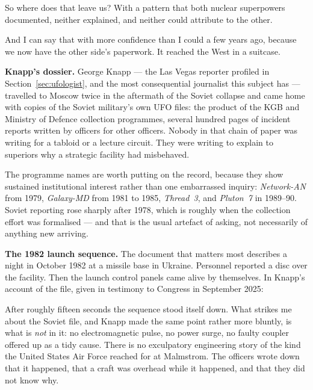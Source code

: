 So where does that leave us? With a pattern that both nuclear superpowers documented, neither
explained, and neither could attribute to the other.

And I can say that with more confidence than I could a few years ago, because we now have the
other side's paperwork. It reached the West in a suitcase.

\textbf{Knapp's dossier.} George Knapp --- the Las Vegas reporter profiled in Section~\ref{sec:ufologist}, and
the most consequential journalist this subject has --- travelled to Moscow twice in the aftermath
of the Soviet collapse and came home with copies of the Soviet military's own UFO files: the
product of the KGB and Ministry of Defence collection programmes, several hundred pages of
incident reports written by officers for other officers. Nobody in that chain of paper was writing
for a tabloid or a lecture circuit. They were writing to explain to superiors why a strategic
facility had misbehaved.

The programme names are worth putting on the record, because they show sustained institutional
interest rather than one embarrassed inquiry: \emph{Network-AN} from 1979, \emph{Galaxy-MD} from
1981 to 1985, \emph{Thread~3}, and \emph{Pluton~7} in 1989--90. Soviet reporting rose sharply
after 1978, which is roughly when the collection effort was formalised --- and that is the usual
artefact of asking, not necessarily of anything new arriving.

\textbf{The 1982 launch sequence.} The document that matters most describes a night in October 1982
at a missile base in Ukraine. Personnel reported a disc over the facility. Then the launch control
panels came alive by themselves. In Knapp's account of the file, given in testimony to Congress in
September 2025:


After roughly fifteen seconds the sequence stood itself down. What strikes me about the Soviet
file, and Knapp made the same point rather more bluntly, is what is \emph{not} in it: no
electromagnetic pulse, no power surge, no faulty coupler offered up as a tidy cause. There is no
exculpatory engineering story of the kind the United States Air Force reached for at Malmstrom. The
officers wrote down that it happened, that a craft was overhead while it happened, and that they
did not know why. 

